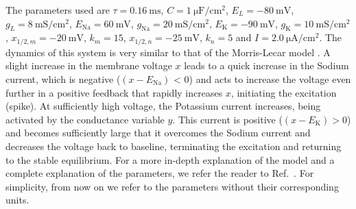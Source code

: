 The parameters used are $\tau = \SI{0.16}{\milli\second}$, $C = \SI{1}{\micro\farad/\centi\meter\squared}$, $E_L = -\SI{80}{\milli\volt}$,$g_L = \SI{8}{\milli\siemens/\centi\meter\squared}$, $E_\mathrm{Na} = \SI{60}{\milli\volt}$, $g_\mathrm{Na} = \SI{20}{\milli\siemens/\centi\meter\squared}$, $E_\mathrm{K} = -\SI{90}{\milli\volt}$, $g_\mathrm{K} = \SI{10}{\milli\siemens/\centi\meter\squared}$, $x_{1/2, m} = \SI{-20}{\milli\volt}$, $k_m = 15$, $x_{1/2, n} = \SI{-25}{\milli\volt}$,  $k_n = 5$ and $I = \SI{2.0}{\micro\ampere/\centi\meter\squared}$. The dynamics of this system is very similar to that of the Morris-Lecar model \cite{morris1981voltage, izhikevichbook}. A slight increase in the membrane voltage $x$ leads to a quick increase in the Sodium current, which is negative ($(x-E_\mathrm{Na})$ < 0) and acts to increase the voltage even further in a positive feedback that rapidly increases $x$, initiating the excitation (spike). At sufficiently high voltage, the Potassium current increases, being activated by the conductance variable $y$. This current is positive ($(x-E_\mathrm{K})>0$) and becomes sufficiently large that it overcomes the Sodium current and decreases the voltage back to baseline, terminating the excitation and returning to the stable equilibrium. For a more in-depth explanation of the model and a complete explanation of the parameters, we refer the reader to Ref.~\cite{izhikevichbook}. For simplicity, from now on we refer to the parameters without their corresponding units. %

